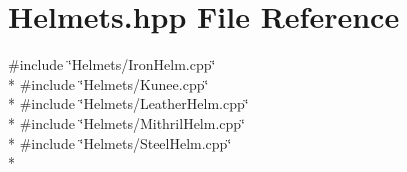 \section{Helmets.\-hpp File Reference}
\label{_helmets_8hpp}
{\ttfamily \#include \char`\"{}Helmets/\-Iron\-Helm.\-cpp\char`\"{}}\\*
{\ttfamily \#include \char`\"{}Helmets/\-Kunee.\-cpp\char`\"{}}\\*
{\ttfamily \#include \char`\"{}Helmets/\-Leather\-Helm.\-cpp\char`\"{}}\\*
{\ttfamily \#include \char`\"{}Helmets/\-Mithril\-Helm.\-cpp\char`\"{}}\\*
{\ttfamily \#include \char`\"{}Helmets/\-Steel\-Helm.\-cpp\char`\"{}}\\*
